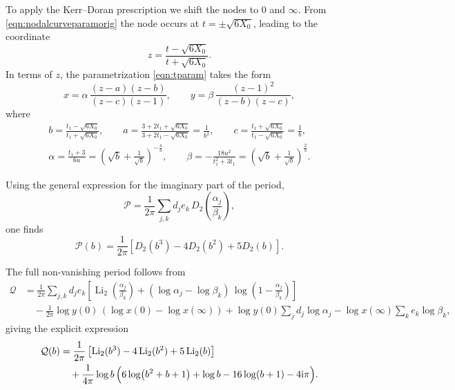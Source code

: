 \documentclass[11pt, a4paper]{article}
\newcommand{\ii}{\mathrm{i}}
\newcommand{\Li}{\operatorname{Li}}
\numberwithin{equation}{section}
\begin{document}
To apply the Kerr–Doran prescription we shift the nodes to $0$ and $\infty$. From \cref{eqn:nodalcurveparamorig} the node occurs at $t=\pm\sqrt{6X_0}$, leading to the coordinate
\begin{equation}
  z = \frac{t - \sqrt{6 X_0}}{t + \sqrt{6 X_0}}.
\end{equation}
In terms of $z$, the parametrization \cref{eqn:tparam} takes the form
\begin{equation}
  x = \alpha\, \frac{(z-a)(z-b)}{(z-c)(z-1)},
  \qquad
  y = \beta\, \frac{(z-1)^2}{(z-b)(z-c)},
\end{equation}
where
\begin{equation}\label{eqn:nodalcurveparams}
\begin{gathered}
  b = \frac{t_1 - \sqrt{6X_0}}{t_1 + \sqrt{6X_0}},
  \qquad
  a = \frac{3 + 2t_1 + \sqrt{6X_0}}{3 + 2t_1 - \sqrt{6X_0}} = \frac{1}{b^2},
  \qquad
  c = \frac{t_1 + \sqrt{6X_0}}{t_1 - \sqrt{6X_0}} = \frac{1}{b},
  \\
  \alpha = \frac{t_1 + 3}{6 u}
  = \left(\sqrt{b} + \frac{1}{\sqrt{b}}\right)^{-\tfrac{4}{3}},
  \qquad
  \beta = -\frac{18 u^2}{t_1^2+3 t_1} = \left(\sqrt{b} + \frac{1}{\sqrt{b}}\right)^{\tfrac{2}{3}}.
\end{gathered}
\end{equation}

Using the general expression for the imaginary part of the period,
\begin{equation}
  \mathcal{P} = \frac{1}{2\pi} \sum_{j,k} d_j e_k\, D_2\!\left(\frac{\alpha_j}{\beta_k}\right),
\end{equation}
one finds
\begin{equation}
  \mathcal{P}(b)
  = \frac{1}{2\pi}\left[ D_2(b^3) - 4D_2(b^2) + 5 D_2(b) \right].
\end{equation}

The full non-vanishing period follows from
\begin{equation}
\begin{aligned}
  \mathcal{Q} 
  &= \frac{1}{2\pi} \sum_{j,k} d_j e_k 
     \left[
       \Li_2\!\left(\frac{\alpha_j}{\beta_k}\right)
       + (\log\alpha_j - \log\beta_k)\,
         \log\!\left(1 - \frac{\alpha_j}{\beta_k}\right)
     \right] \\
  &\quad - \frac{1}{2\pi} \log y(0)\,
        \left(\log x(0) - \log x(\infty)\right)
        + \log y(0) \sum_j d_j \log\alpha_j
        - \log x(\infty) \sum_k e_k \log\beta_k,
\end{aligned}
\end{equation}
giving the explicit expression
\begin{equation}
\begin{aligned}
  \mathcal{Q}(b)
  &= \frac{1}{2\pi}\left[\Li_2(b^3) - 4\Li_2(b^2) + 5\Li_2(b)\right] \\
  &\quad + \frac{1}{4\pi}\log b\,
      \Bigl( 6\log(b^2+b+1) + \log b - 16\log(b+1) - 4\ii\pi \Bigr).
\end{aligned}
\end{equation}
\end{document}

